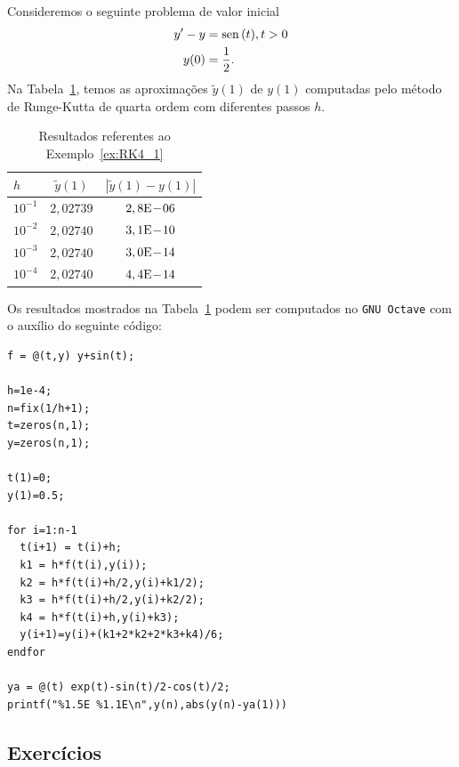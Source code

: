 \begin{ex}\label{ex:RK4_1}
  Consideremos o seguinte problema de valor inicial
  \begin{align}
    y' - y &= \operatorname{sen}\,(t), t>0\\
    y(0) &= \frac{1}{2}.
  \end{align}
  Na Tabela~\ref{tab:ex_RK4_1}, temos as aproximações $\tilde{y}(1)$ de $y(1)$ computadas pelo método de Runge-Kutta de quarta ordem com diferentes passos $h$.
 
  \begin{table}[h!]
    \centering
    \begin{tabular}{l|cc}
      $h$ & $\tilde{y}(1)$ & $|\tilde{y}(1)-y(1)|$\\\hline
      $10^{-1}$ & $2,02739$ & $2,8\mathrm{E}\!-\!06$ \\
      $10^{-2}$ & $2,02740$ & $3,1\mathrm{E}\!-\!10$ \\
      $10^{-3}$ & $2,02740$ & $3,0\mathrm{E}\!-\!14$ \\
      $10^{-4}$ & $2,02740$ & $4,4\mathrm{E}\!-\!14$ \\\hline
    \end{tabular}
    \caption{Resultados referentes ao Exemplo~\ref{ex:RK4_1}}
    \label{tab:ex_RK4_1}
  \end{table}

\ifisoctave
Os resultados mostrados na Tabela~\ref{tab:ex_RK4_1} podem ser computados no \verb+GNU Octave+ com o auxílio do seguinte código:
\begin{verbatim}
f = @(t,y) y+sin(t);

h=1e-4;
n=fix(1/h+1);
t=zeros(n,1);
y=zeros(n,1);

t(1)=0;
y(1)=0.5;

for i=1:n-1
  t(i+1) = t(i)+h;
  k1 = h*f(t(i),y(i));
  k2 = h*f(t(i)+h/2,y(i)+k1/2);
  k3 = h*f(t(i)+h/2,y(i)+k2/2);
  k4 = h*f(t(i)+h,y(i)+k3);
  y(i+1)=y(i)+(k1+2*k2+2*k3+k4)/6;
endfor

ya = @(t) exp(t)-sin(t)/2-cos(t)/2;
printf("%1.5E %1.1E\n",y(n),abs(y(n)-ya(1)))
\end{verbatim}
\fi
\end{ex}

\subsection{Exercícios}

